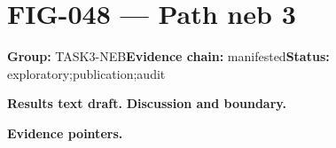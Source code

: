 \clearpage
\section{FIG-048 --- Path neb 3}
\label{figpage:fig-048}
\textbf{Group:} TASK3-NEB\quad \textbf{Evidence chain:} manifested\quad \textbf{Status:} exploratory;publication;audit

\textbf{Results text draft.} 
\textbf{Discussion and boundary.} 


\textbf{Evidence pointers.}



\vfill
